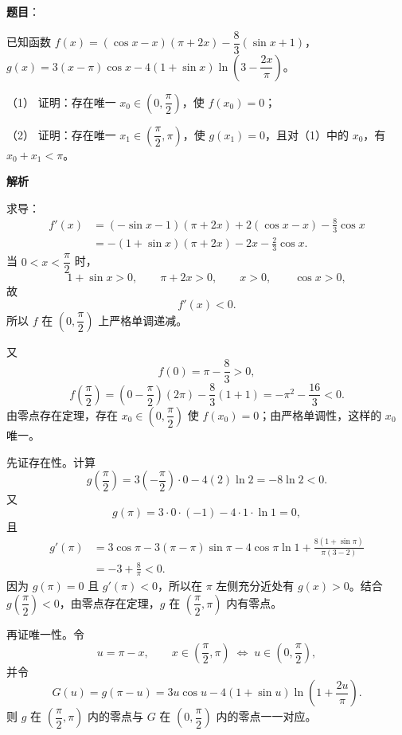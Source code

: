 \begin{answer}

\textbf{题目}：

已知函数 $f(x)=(\cos x-x)(\pi+2x)-\dfrac83(\sin x+1)$，$g(x)=3(x-\pi)\cos x-4(1+\sin x)\ln\left(3-\dfrac{2x}{\pi}\right)$。

（1） 证明：存在唯一 $x_0\in\left(0,\dfrac\pi2\right)$，使 $f(x_0)=0$；

（2） 证明：存在唯一 $x_1\in\left(\dfrac\pi2,\pi\right)$，使 $g(x_1)=0$，且对（1）中的 $x_0$，有 $x_0+x_1<\pi$。

\textbf{解析}


求导：
\nopagebreak[4]
\[\begin{aligned}
f'(x)
&=(-\sin x-1)(\pi+2x)+2(\cos x-x)-\frac83\cos x\\
&=-(1+\sin x)(\pi+2x)-2x-\frac23\cos x.
\end{aligned}\]
当 $0<x<\dfrac\pi2$ 时，
\nopagebreak[4]
\[1+\sin x>0,\qquad \pi+2x>0,\qquad x>0,\qquad \cos x>0,\]
故
\nopagebreak[4]
\[f'(x)<0.\]
所以 $f$ 在 $\left(0,\dfrac\pi2\right)$ 上严格单调递减。

又
\nopagebreak[4]
\[f(0)=\pi-\frac83>0,\]
\nopagebreak[4]
\[f\left(\frac\pi2\right)
=\left(0-\frac\pi2\right)(2\pi)-\frac83(1+1)
=-\pi^2-\frac{16}3<0.\]
由零点存在定理，存在 $x_0\in\left(0,\dfrac\pi2\right)$ 使 $f(x_0)=0$；由严格单调性，这样的 $x_0$ 唯一。


先证存在性。计算
\nopagebreak[4]
\[g\left(\frac\pi2\right)
=3\left(-\frac\pi2\right)\cdot0-4(2)\ln2
=-8\ln2<0.\]
又
\nopagebreak[4]
\[g(\pi)=3\cdot0\cdot(-1)-4\cdot1\cdot\ln1=0,\]
且
\nopagebreak[4]
\[\begin{aligned}
g'(\pi)
&=3\cos\pi-3(\pi-\pi)\sin\pi-4\cos\pi\ln1
+\frac{8(1+\sin\pi)}{\pi(3-2)}\\
&=-3+\frac8\pi<0.
\end{aligned}\]
因为 $g(\pi)=0$ 且 $g'(\pi)<0$，所以在 $\pi$ 左侧充分近处有 $g(x)>0$。结合 $g\left(\dfrac\pi2\right)<0$，由零点存在定理，$g$ 在 $\left(\dfrac\pi2,\pi\right)$ 内有零点。

再证唯一性。令
\nopagebreak[4]
\[u=\pi-x,\qquad x\in\left(\frac\pi2,\pi\right)
\;\Longleftrightarrow\;
u\in\left(0,\frac\pi2\right),\]
并令
\nopagebreak[4]
\[G(u)=g(\pi-u)
=3u\cos u-4(1+\sin u)\ln\left(1+\frac{2u}{\pi}\right).\]
则 $g$ 在 $\left(\dfrac\pi2,\pi\right)$ 内的零点与 $G$ 在 $\left(0,\dfrac\pi2\right)$ 内的零点一一对应。


\end{answer}
